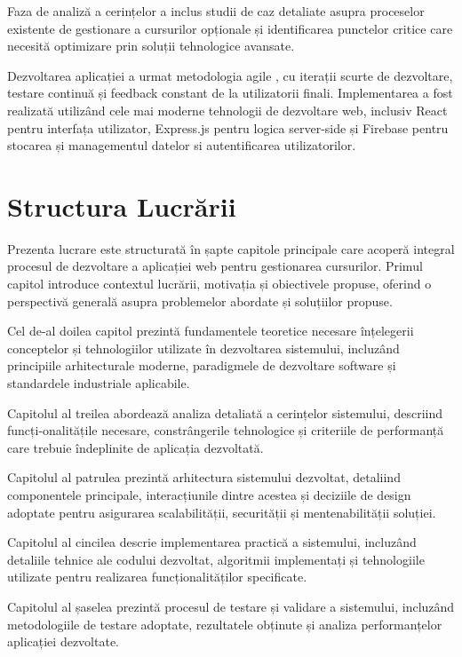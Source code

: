 \documentclass[12pt,a4paper]{report}
\begin{document}
Faza de analiză a cerințelor a inclus studii de caz detaliate asupra proceselor existente de gestionare a cursurilor opționale și identificarea punctelor critice care necesită optimizare prin soluții tehnologice avansate.

Dezvoltarea aplicației a urmat metodologia agile \cite{agile-manifesto}, cu iterații scurte de dezvoltare, testare continuă și feedback constant de la utilizatorii finali. Implementarea a fost realizată utilizând cele mai moderne tehnologii de dezvoltare web, inclusiv React pentru interfața utilizator, Express.js pentru logica server-side și Firebase pentru stocarea și managementul datelor si autentificarea utilizatorilor.

\section{Structura Lucrării}

Prezenta lucrare este structurată în șapte capitole principale care acoperă integral procesul de dezvoltare a aplicației web pentru gestionarea cursurilor. Primul capitol introduce contextul lucrării, motivația și obiectivele propuse, oferind o perspectivă generală asupra problemelor abordate și soluțiilor propuse.

Cel de-al doilea capitol prezintă fundamentele teoretice necesare înțelegerii conceptelor și tehnologiilor utilizate în dezvoltarea sistemului, incluzând principiile arhitecturale moderne, paradigmele de dezvoltare software și standardele industriale aplicabile.

Capitolul al treilea abordează analiza detaliată a cerințelor sistemului, descriind funcți-onalitățile necesare, constrângerile tehnologice și criteriile de performanță care trebuie îndeplinite de aplicația dezvoltată.

Capitolul al patrulea prezintă arhitectura sistemului dezvoltat, detaliind componentele principale, interacțiunile dintre acestea și deciziile de design adoptate pentru asigurarea scalabilității, securității și mentenabilității soluției.

Capitolul al cincilea descrie implementarea practică a sistemului, incluzând detaliile tehnice ale codului dezvoltat, algoritmii implementați și tehnologiile utilizate pentru realizarea funcționalităților specificate.

Capitolul al șaselea prezintă procesul de testare și validare a sistemului, incluzând metodologiile de testare adoptate, rezultatele obținute și analiza performanțelor aplicației dezvoltate.
\end{document}
